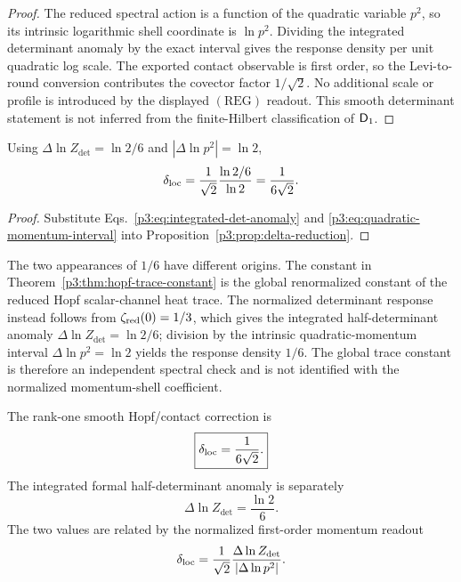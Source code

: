 \documentclass[12pt,a4paper]{article}
\begin{document}
\begin{proof}
The reduced spectral action is a function of the quadratic variable \(p^2\), so
its intrinsic logarithmic shell coordinate is \(\ln p^2\).  Dividing the
integrated determinant anomaly by the exact interval gives the response density
per unit quadratic log scale.  The exported contact observable is first order,
so the Levi-to-round conversion contributes the covector factor \(1/\sqrt2\).
No additional scale or profile is introduced by the displayed \((\mathrm{REG})\) readout.  This smooth determinant statement is not inferred from the finite-Hilbert classification of \(\mathsf{D}_1\).
\end{proof}

\begin{proposition}
\label{p3:prop:delta-sqrt2}
Using \(\Delta\ln Z_{\det}=\ln2/6\) and
\(|\Delta\ln p^2|=\ln2\),
\begin{equation}
\label{p3:eq:delta-from-levi-round}
 \delta_{\rm loc}
 =\frac1{\sqrt2}\frac{\ln2/6}{\ln2}
 =\frac{1}{6\sqrt2}.
\end{equation}
\end{proposition}

\begin{proof}
Substitute
Eqs.~\eqref{p3:eq:integrated-det-anomaly} and
\eqref{p3:eq:quadratic-momentum-interval} into
Proposition~\ref{p3:prop:delta-reduction}.
\end{proof}

\begin{remark}
The two appearances of \(1/6\) have different origins.  The constant in
Theorem~\ref{p3:thm:hopf-trace-constant} is the global renormalized constant
of the reduced Hopf scalar-channel heat trace.  The normalized determinant
response instead follows from \(\zeta_{\rm red}(0)=1/3\), which gives the
integrated half-determinant anomaly \(\Delta\ln Z_{\det}=\ln2/6\); division by the
intrinsic quadratic-momentum interval \(\Delta\ln p^2=\ln2\) yields the
response density \(1/6\).  The global trace constant is therefore an
independent spectral check and is not identified with the normalized
momentum-shell coefficient.
\end{remark}

\begin{theorem}
\label{p3:thm:delta_rigorous}
The rank-one smooth Hopf/contact correction is
\begin{equation}
 \boxed{\delta_{\rm loc}=\frac{1}{6\sqrt2}.}
\end{equation}
The integrated formal half-determinant anomaly is separately
\begin{equation}
 \boxed{\Delta\ln Z_{\det}=\frac{\ln2}{6}.}
\end{equation}
The two values are related by the normalized first-order momentum readout
\[
 \delta_{\rm loc}
 =\frac1{\sqrt2}
  \frac{\Delta\ln Z_{\det}}{|\Delta\ln p^2|}.
\]
\end{theorem}
\end{document}
